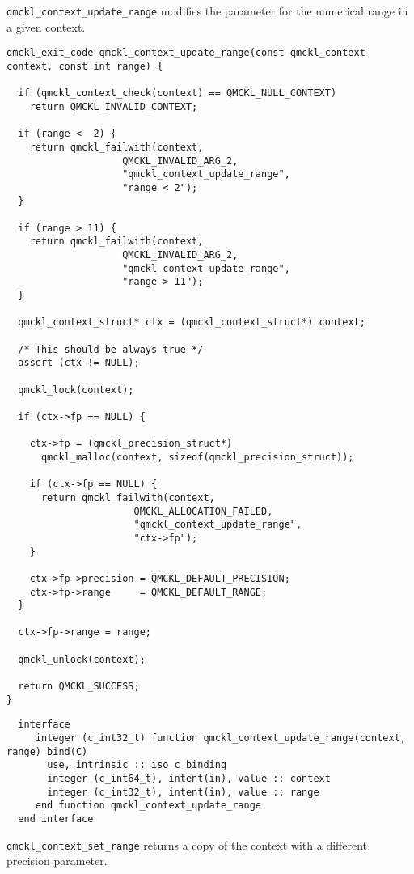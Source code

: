 \texttt{qmckl\_context\_update\_range} modifies the parameter for the numerical range in a given context.

\begin{verbatim}
qmckl_exit_code qmckl_context_update_range(const qmckl_context context, const int range) {

  if (qmckl_context_check(context) == QMCKL_NULL_CONTEXT)
    return QMCKL_INVALID_CONTEXT;

  if (range <  2) {
    return qmckl_failwith(context,
                    QMCKL_INVALID_ARG_2,
                    "qmckl_context_update_range",
                    "range < 2");
  }

  if (range > 11) {
    return qmckl_failwith(context,
                    QMCKL_INVALID_ARG_2,
                    "qmckl_context_update_range",
                    "range > 11");
  }

  qmckl_context_struct* ctx = (qmckl_context_struct*) context;

  /* This should be always true */
  assert (ctx != NULL);

  qmckl_lock(context);

  if (ctx->fp == NULL) {

    ctx->fp = (qmckl_precision_struct*)
      qmckl_malloc(context, sizeof(qmckl_precision_struct));

    if (ctx->fp == NULL) {
      return qmckl_failwith(context,
                      QMCKL_ALLOCATION_FAILED,
                      "qmckl_context_update_range",
                      "ctx->fp");
    }

    ctx->fp->precision = QMCKL_DEFAULT_PRECISION;
    ctx->fp->range     = QMCKL_DEFAULT_RANGE;
  }

  ctx->fp->range = range;

  qmckl_unlock(context);

  return QMCKL_SUCCESS;
}
\end{verbatim}

\begin{verbatim}
  interface
     integer (c_int32_t) function qmckl_context_update_range(context, range) bind(C)
       use, intrinsic :: iso_c_binding
       integer (c_int64_t), intent(in), value :: context
       integer (c_int32_t), intent(in), value :: range
     end function qmckl_context_update_range
  end interface
\end{verbatim}

\texttt{qmckl\_context\_set\_range} returns a copy of the context with a different precision parameter.

